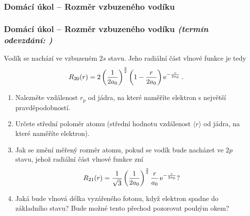 \documentclass[a4paper,11pt,twoside]{article}
\newenvironment{homework}{}{}
\newcommand{\np}{\clearpage\newpage}
\newcommand{\exercise}[2][]{\ifthenelse{\isempty{#1}}
	{\np\thispagestyle{empty}\subsubsection*{Domácí úkol -- #2}}
	{\np\thispagestyle{empty}\np\subsubsection*{Domácí úkol -- #2 \small{\it{(termín odevzdání: {#1})}}}}
}
\begin{document}
\begin{homework}
	\exercise{Rozměr vzbuzeného vodíku}
		Vodík se nachází ve vzbuzeném $2s$ stavu.
		Jeho radiální část vlnové funkce je tedy
		\begin{equation*}
			R_{20}(r)=2\left(\frac{1}{2a_{0}}\right)^{\frac{3}{2}}\left(1-\frac{r}{2a_{0}}\right)\operatorname{e}^{-\frac{r}{2a_0}}.
		\end{equation*}

		\begin{enumerate}
			\item
				Nalezněte vzdálenost $r_{p}$ od jádra, na které naměříte elektron s největší pravděpodobností.
			\item
				Určete střední poloměr atomu (střední hodnotu vzdálenost $\langle r\rangle$ od jádra, na které naměříte elektron).
			\item
				Jak se změní měřený rozměr atomu, pokud se vodík bude nacházet ve $2p$ stavu, jehož radiální část vlnové funkce zní
				\begin{equation*}
					R_{21}(r)=\frac{1}{\sqrt{3}}\left(\frac{1}{2a_{0}}\right)^{\frac{3}{2}}\frac{r}{a_{0}}\operatorname{e}^{-\frac{r}{2a_{0}}}?
				\end{equation*}
			\item
				Jaká bude vlnová délka vyzářeného fotonu, když elektron spadne do základního stavu?
				Bude možné tento přechod pozorovat pouhým okem?
		\end{enumerate}

		\newpage
\end{homework}

\printindex

%
\printbibliography
%
\end{document}
